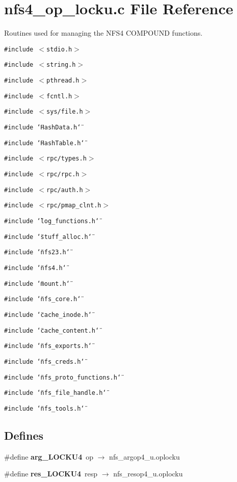 \section{nfs4\_\-op\_\-locku.c File Reference}
\label{nfs4__op__locku_8c}
Routines used for managing the NFS4 COMPOUND functions. 

{\tt \#include $<$stdio.h$>$}\par
{\tt \#include $<$string.h$>$}\par
{\tt \#include $<$pthread.h$>$}\par
{\tt \#include $<$fcntl.h$>$}\par
{\tt \#include $<$sys/file.h$>$}\par
{\tt \#include \char`\"{}Hash\-Data.h\char`\"{}}\par
{\tt \#include \char`\"{}Hash\-Table.h\char`\"{}}\par
{\tt \#include $<$rpc/types.h$>$}\par
{\tt \#include $<$rpc/rpc.h$>$}\par
{\tt \#include $<$rpc/auth.h$>$}\par
{\tt \#include $<$rpc/pmap\_\-clnt.h$>$}\par
{\tt \#include \char`\"{}log\_\-functions.h\char`\"{}}\par
{\tt \#include \char`\"{}stuff\_\-alloc.h\char`\"{}}\par
{\tt \#include \char`\"{}nfs23.h\char`\"{}}\par
{\tt \#include \char`\"{}nfs4.h\char`\"{}}\par
{\tt \#include \char`\"{}mount.h\char`\"{}}\par
{\tt \#include \char`\"{}nfs\_\-core.h\char`\"{}}\par
{\tt \#include \char`\"{}cache\_\-inode.h\char`\"{}}\par
{\tt \#include \char`\"{}cache\_\-content.h\char`\"{}}\par
{\tt \#include \char`\"{}nfs\_\-exports.h\char`\"{}}\par
{\tt \#include \char`\"{}nfs\_\-creds.h\char`\"{}}\par
{\tt \#include \char`\"{}nfs\_\-proto\_\-functions.h\char`\"{}}\par
{\tt \#include \char`\"{}nfs\_\-file\_\-handle.h\char`\"{}}\par
{\tt \#include \char`\"{}nfs\_\-tools.h\char`\"{}}\par
\subsection*{Defines}
\begin{CompactItemize}
\item 
\#define {\bf arg\_\-LOCKU4}\ op $\rightarrow$ nfs\_\-argop4\_\-u.oplocku
\item 
\#define {\bf res\_\-LOCKU4}\ resp $\rightarrow$ nfs\_\-resop4\_\-u.oplocku
\end{CompactItemize}
